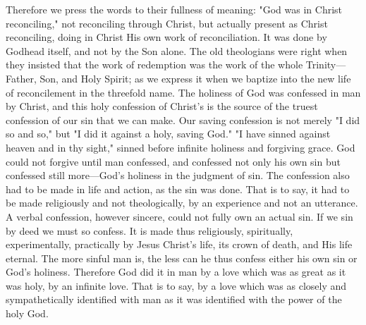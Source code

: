 \documentclass[12pt,letterpaper,oneside]{book}
\begin{document}
Therefore we press the words to their fullness 
of meaning: "God was in Christ reconciling," 
not reconciling through Christ, but actually 
present as Christ reconciling, doing in Christ 
His own work of reconciliation. It was done by 
Godhead itself, and not by the Son alone. The 
old theologians were right when they insisted 
that the work of redemption was the work of 
the whole Trinity---Father, Son, and Holy 
Spirit; as we express it when we baptize into 
the new life of reconcilement in the threefold 
name. The holiness of God was confessed in 
man by Christ, and this holy confession of 
Christ's is the source of the truest confession of 
our sin that we can make. Our saving confession 
is not merely "I did so and so," but "I did 
it against a holy, saving God." "I have sinned 
against heaven and in thy sight," sinned before 
infinite holiness and forgiving grace. God could 
not forgive until man confessed, and confessed 
not only his own sin but confessed still more---God's 
holiness in the judgment of sin. The 
confession also had to be made in life and action, 
as the sin was done. That is to say, it had to be 
made religiously and not theologically, by an 
experience and not an utterance. A verbal 
confession, however sincere, could not fully own 
an actual sin. If we sin by deed we must so 
confess. It is made thus religiously, spiritually, 
experimentally, practically by Jesus Christ's 
life, its crown of death, and His life eternal. 
The more sinful man is, the less can he thus 
confess either his own sin or God's holiness. 
Therefore God did it in man by a love which 
was as great as it was holy, by an infinite love. 
That is to say, by a love which was as closely 
and sympathetically identified with man as it 
was identified with the power of the holy God. 
\end{document}
